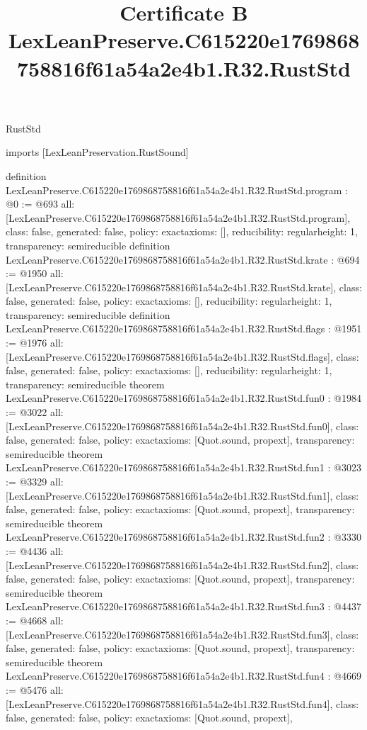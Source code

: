\begin{lexlean}{RustStd}
\title{Certificate B LexLeanPreserve.C615220e1769868758816f61a54a2e4b1.R32.RustStd}
\begin{coremodule}
imports [LexLeanPreservation.RustSound]

definition LexLeanPreserve.C615220e1769868758816f61a54a2e4b1.R32.RustStd.program : @0 := @693 {
  all: [LexLeanPreserve.C615220e1769868758816f61a54a2e4b1.R32.RustStd.program],
  class: false,
  generated: false,
  policy: exact{axioms: []},
  reducibility: regular{height: 1},
  transparency: semireducible
}
definition LexLeanPreserve.C615220e1769868758816f61a54a2e4b1.R32.RustStd.krate : @694 := @1950 {
  all: [LexLeanPreserve.C615220e1769868758816f61a54a2e4b1.R32.RustStd.krate],
  class: false,
  generated: false,
  policy: exact{axioms: []},
  reducibility: regular{height: 1},
  transparency: semireducible
}
definition LexLeanPreserve.C615220e1769868758816f61a54a2e4b1.R32.RustStd.flags : @1951 := @1976 {
  all: [LexLeanPreserve.C615220e1769868758816f61a54a2e4b1.R32.RustStd.flags],
  class: false,
  generated: false,
  policy: exact{axioms: []},
  reducibility: regular{height: 1},
  transparency: semireducible
}
theorem LexLeanPreserve.C615220e1769868758816f61a54a2e4b1.R32.RustStd.fun0 : @1984 := @3022 {
  all: [LexLeanPreserve.C615220e1769868758816f61a54a2e4b1.R32.RustStd.fun0],
  class: false,
  generated: false,
  policy: exact{axioms: [Quot.sound, propext]},
  transparency: semireducible
}
theorem LexLeanPreserve.C615220e1769868758816f61a54a2e4b1.R32.RustStd.fun1 : @3023 := @3329 {
  all: [LexLeanPreserve.C615220e1769868758816f61a54a2e4b1.R32.RustStd.fun1],
  class: false,
  generated: false,
  policy: exact{axioms: [Quot.sound, propext]},
  transparency: semireducible
}
theorem LexLeanPreserve.C615220e1769868758816f61a54a2e4b1.R32.RustStd.fun2 : @3330 := @4436 {
  all: [LexLeanPreserve.C615220e1769868758816f61a54a2e4b1.R32.RustStd.fun2],
  class: false,
  generated: false,
  policy: exact{axioms: [Quot.sound, propext]},
  transparency: semireducible
}
theorem LexLeanPreserve.C615220e1769868758816f61a54a2e4b1.R32.RustStd.fun3 : @4437 := @4668 {
  all: [LexLeanPreserve.C615220e1769868758816f61a54a2e4b1.R32.RustStd.fun3],
  class: false,
  generated: false,
  policy: exact{axioms: [Quot.sound, propext]},
  transparency: semireducible
}
theorem LexLeanPreserve.C615220e1769868758816f61a54a2e4b1.R32.RustStd.fun4 : @4669 := @5476 {
  all: [LexLeanPreserve.C615220e1769868758816f61a54a2e4b1.R32.RustStd.fun4],
  class: false,
  generated: false,
  policy: exact{axioms: [Quot.sound, propext]},
}
\end{coremodule}
\end{lexlean}
